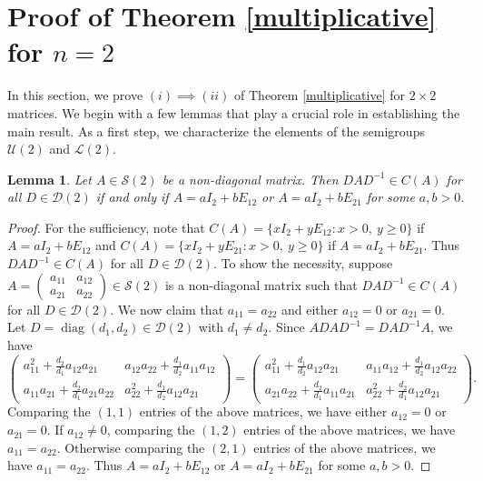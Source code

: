 \documentclass[11pt,reqno]{amsart}
\theoremstyle{plain}
\newtheorem{lemma}[theorem]{Lemma}
\theoremstyle{definition}
\numberwithin{equation}{section}
\DeclareMathOperator{\diag}{diag}
\def\cS{\mathcal S}
\def\cD{\mathcal D}
\def\cU{\mathcal U}
\def\cL{\mathcal L}
\begin{document}
\section{Proof of Theorem \ref{multiplicative} for $n=2$}
In this section, we prove $(i)\implies (ii)$ of Theorem \ref{multiplicative} for $2\times2$ matrices. We begin with a few lemmas that play a crucial role in establishing the main result. As a first step, we characterize the elements of the semigroups $\cU(2)$ and $\cL(2)$.
\begin{lemma}\label{pc4.1}
	Let $A \in \cS(2)$ be a non-diagonal matrix. Then $DAD^{-1} \in C(A)$ for all $D\in \cD(2)$ if and only if   $A =a I_2 + bE_{12}$  or 
	$A =a I_2 + bE_{21}$ for some $a, b >0$.
\end{lemma}
\begin{proof}
	For the sufficiency, note that 
	$C(A) = \{ x I_2 + yE_{12}: x>0,~ y \ge 0\}$ if $A = a I_2 + b E_{12}$  and $C (A) = \{x I_2 + yE_{21}: x>0,~ y \ge 0\}$ if $A = aI_2 + bE_{21}$. Thus $DAD^{-1}\in C(A)$  for all $D\in \cD(2)$.   To show the necessity, suppose $A=\begin{pmatrix}
		a_{11} & 	a_{12} \\ 	a_{21} & 	a_{22}
	\end{pmatrix} \in \cS(2)$ is a non-diagonal matrix such that $DAD^{-1} \in C(A)$ for all $D\in \cD(2)$. We now claim that $a_{11}=	a_{22}$ and either $ a_{12}=0$ or 	$a_{21}=0$. Let $D=\diag(d_1,d_2)\in \cD(2)$ with $d_1\neq d_2$.  Since $A DAD^{-1}=DAD^{-1}A$, we have
	\[\begin{pmatrix}
		a^2_{11}+\frac{d_2}{d_1}a_{12} a_{21} & a_{12}a_{22}+\frac{d_1}{d_2} a_{11} a_{12}\\ a_{11} a_{21} +\frac{d_2}{d_1}a_{21}a_{22} &  a^2_{22}+\frac{d_1}{d_2}a_{12} a_{21}
	\end{pmatrix}=\begin{pmatrix}
		a^2_{11}+\frac{d_1}{d_2}a_{12} a_{21} & a_{11} a_{12}+  \frac{d_1}{d_2}a_{12}a_{22}\\  a_{21}a_{22}+\frac{d_2}{d_1} a_{11} a_{21} &  a^2_{22}+\frac{d_2}{d_1}a_{12} a_{21}
	\end{pmatrix}.\]
Comparing the $(1,1)$ entries of the above matrices, we have either $a_{12}=0$ or $a_{21}=0$. If $a_{12}\neq 0$, comparing the $(1,2)$ entries of the above matrices, we have $a_{11}=a_{22}$. Otherwise comparing the $(2,1)$ entries of the above matrices, we have $a_{11}=a_{22}$. Thus  $A =a I_2 + bE_{12}$  or 
	$A =a I_2 + bE_{21}$ for some $a, b >0$.
\end{proof}
\end{document}
